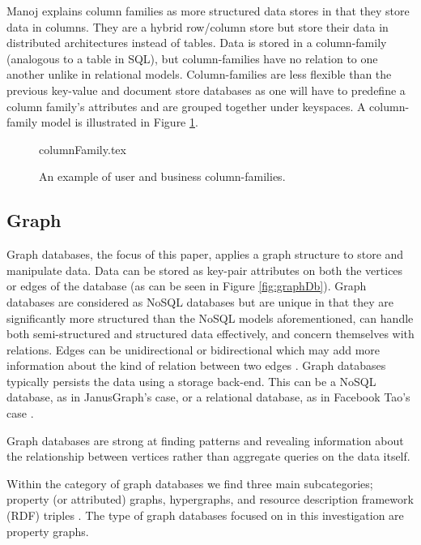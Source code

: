 Manoj \cite{docstoreArticle} explains column families as more structured data stores in that they store data in columns. They are a hybrid row/column store but store their data in distributed architectures instead of tables. Data is stored in a column-family (analogous to a table in SQL), but column-families have no relation to one another unlike in relational models. Column-families are less flexible than the previous key-value and document store databases as one will have to predefine a column family's attributes and are grouped together under keyspaces. A column-family model is illustrated in Figure \ref{fig:colfam}.

\begin{figure}[h]
    \small
    \centering
    {columnFamily.tex}
    \vspace*{5mm}
    \caption{An example of user and business column-families.}
    \label{fig:colfam}
\end{figure}

\subsection{Graph}

Graph databases, the focus of this paper, applies a graph structure to store and manipulate data. Data can be stored as key-pair attributes on both the vertices or edges of the database (as can be seen in Figure \ref{fig:graphDb}). Graph databases are considered as NoSQL databases but are unique in that they are significantly more structured than the NoSQL models aforementioned, can handle both semi-structured and structured data effectively, and concern themselves with relations. Edges can be unidirectional or bidirectional which may add more information about the kind of relation between two edges \cite{nosqlDb}. Graph databases typically persists the data using a storage back-end. This can be a NoSQL database, as in JanusGraph's case, or a relational database, as in Facebook Tao's case \cite{bronson2013tao}.

Graph databases are strong at finding patterns and revealing information about the relationship between vertices rather than aggregate queries on the data itself.

Within the category of graph databases we find three main subcategories; property (or attributed) graphs, hypergraphs, and resource description framework (RDF) triples \cite{socialData}. The type of graph databases focused on in this investigation are property graphs.

